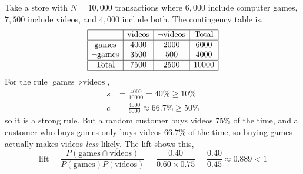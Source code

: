 \documentclass[12pt,letterpaper, onecolumn]{exam}
\begin{document}
\begin{questions}
    \begin{solution}

        Take a store with $N=10{,}000$ transactions where $6{,}000$ include computer games, $7{,}500$ include videos, and $4{,}000$ include both. The contingency table is,
        \begin{equation*}
            \begin{array}{|c|c|c|c|}
                \hline & \text{videos} & \neg\text{videos} & \text{Total} \\ \hline
                \text{games} & 4000 & 2000 & 6000 \\
                \neg\text{games} & 3500 & 500 & 4000 \\ \hline
                \text{Total} & 7500 & 2500 & 10000 \\ \hline
            \end{array}
        \end{equation*}
        For the rule $\text{games}\Rightarrow\text{videos}$,
        \begin{align*}
            s &= \frac{4000}{10000} = 40\% \geq 10\% \\
            c &= \frac{4000}{6000} \approx 66.7\% \geq 50\%
        \end{align*}
        so it is a strong rule. But a random customer buys videos $75\%$ of the time, and a customer who buys games only buys videos $66.7\%$ of the time, so buying games actually makes videos \textit{less} likely. The lift shows this,
        \begin{equation*}
            \text{lift} = \frac{P(\text{games}\cap\text{videos})}{P(\text{games})P(\text{videos})} = \frac{0.40}{0.60\times0.75} = \frac{0.40}{0.45} \approx 0.889 < 1
        \end{equation*}


\end{solution}
\end{questions}
\end{document}

